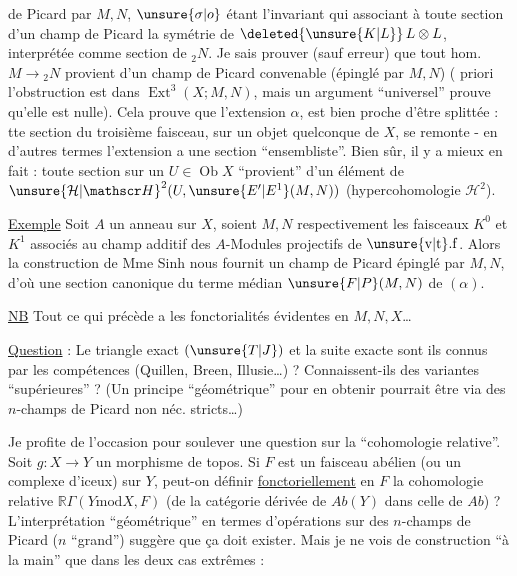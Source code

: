  de Picard  par $M,N$, $\unsure{\sigma|o}$ étant l'invariant qui  associant à toute section  d'un champ de Picard la symétrie de $\deleted{\unsure{K|L}}\,L\otimes L$, interprétée comme section de ${}_{2}N$. Je sais prouver (sauf erreur) que tout hom. $M\to{}_{2}N$ provient d'un champ de Picard convenable (épinglé par $M,N$) ( priori l'obstruction est dans $\operatorname{Ext}^{3}(X;M,N)$, mais un argument ``universel'' prouve qu'elle est nulle). Cela prouve que l'extension $\alpha$, est bien proche d'être splittée : tte section du troisième faisceau, sur un objet quelconque de $X$, se remonte - en d'autres termes l'extension a une section ``ensembliste''. Bien sûr, il y a mieux en fait : toute section sur un $U\in\operatorname{Ob}X$ ``provient'' d'un élément de ${\unsure{\mathcal H|\mathscr H}}^{2}(U,\unsure{E'|E^{1}}(M,N))$ (hypercohomologie $\mathcal H^{2}$).

\uline{Exemple} Soit $A$ un anneau sur $X$, soient $M,N$ respectivement les faisceaux $K^{0}$ et $K^{1}$ associés au champ additif des $A$-Modules projectifs de $\unsure{\mathrm{v}|\mathrm{t}}.\mathrm{f}$.  Alors la construction de Mme Sinh nous fournit un champ de Picard épinglé par $M,N$, d'où une section  canonique du terme médian $\unsure{F|P}(M,N)$ de $(\alpha)$.

\uline{NB} Tout ce qui précède a les fonctorialités évidentes en $M,N,X$\ldots

\uline{Question} : Le triangle exact $(\unsure{T|J})$ et \unsure{-} la suite exacte \unsure{$\alpha$)|($\alpha$)|$\alpha$} sont ils connus par les compétences (Quillen, Breen, Illusie\ldots) ? Connaissent-ils des variantes ``supérieures'' ? (Un principe ``géométrique'' pour en obtenir pourrait être via des $n$-champs de Picard non néc. stricts\ldots)

Je profite de l'occasion pour soulever une question sur la ``cohomologie relative''. Soit $g:X\to Y$ un morphisme de topos. Si $F$ est un faisceau abélien (ou un complexe d'iceux) sur $Y$, peut-on définir \uline{fonctoriellement} en $F$ la cohomologie relative $\mathbb R\Gamma(Y\mathbin{\mathrm{mod}}X,F)$ (de la catégorie dérivée de $\mathit{Ab}(Y)$ dans celle de $\mathit{Ab}$) ? L'interprétation ``géométrique'' en termes d'opérations sur des $n$-champs de Picard ($n$ ``grand'') suggère que ça doit exister. Mais je ne vois de construction  ``à la main'' que dans les deux cas extrêmes :

